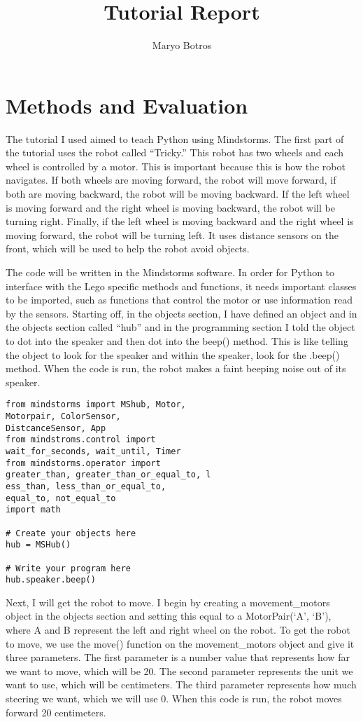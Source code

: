 \documentclass[10pt,twocolumn]{article}
\title{Tutorial Report}
\author{Maryo Botros}
\affiliation{Occidental College}
\begin{document}
\maketitle

\section{Methods and Evaluation}
The tutorial I used aimed to teach Python using Mindstorms. The first part of the tutorial uses the robot called “Tricky.” This robot has two wheels and each wheel is controlled by a motor. This is important because this is how the robot navigates. If both wheels are moving forward, the robot will move forward, if both are moving backward, the robot will be moving backward. If the left wheel is moving forward and the right wheel is moving backward, the robot will be turning right. Finally, if the left wheel is moving backward and the right wheel is moving forward, the robot will be turning left. It uses distance sensors on the front, which will be used to help the robot avoid objects. 

The code will be written in the Mindstorms software. In order for Python to interface with the Lego specific methods and functions, it needs important classes to be imported, such as functions that control the motor or use information read by the sensors. Starting off, in the objects section, I have defined an object and in the objects section called “hub” and in the programming section I told the object to dot into the speaker and then dot into the beep() method. This is like telling the object  to look for the speaker and within the speaker, look for the .beep() method. When the code is run, the robot makes a faint beeping noise out of its speaker. 
\begin{verbatim}
from mindstorms import MShub, Motor, 
Motorpair, ColorSensor, 
DistcanceSensor, App
from mindstroms.control import
wait_for_seconds, wait_until, Timer 
from mindstorms.operator import 
greater_than, greater_than_or_equal_to, l
ess_than, less_than_or_equal_to, 
equal_to, not_equal_to
import math 

# Create your objects here
hub = MSHub()
 
# Write your program here
hub.speaker.beep()
\end{verbatim}

Next, I will get the robot to move. I begin by creating a  movement\_motors object in the objects section and setting this equal to a MotorPair(‘A’, ‘B’), where A and B represent the left and right wheel on the robot. To get the robot to move, we use the move() function on the movement\_motors object and give it three parameters. The first parameter is a number value that represents how far we want to move, which will be 20. The second parameter represents the unit we want to use, which will be centimeters. The third parameter represents how much steering we want, which we will use 0. When this code is run, the robot moves forward 20 centimeters.
\end{document}
